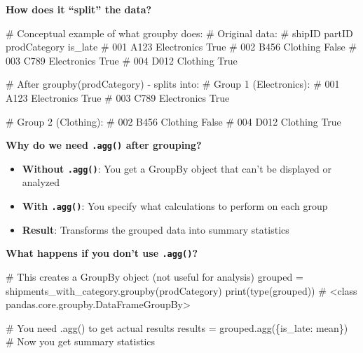 \documentclass[
  letterpaper,
  DIV=11,
  numbers=noendperiod]{scrartcl}
\newenvironment{Shaded}{\begin{snugshade}}{\end{snugshade}}
\newcommand{\BuiltInTok}[1]{\textcolor[rgb]{0.00,0.23,0.31}{#1}}
\newcommand{\CommentTok}[1]{\textcolor[rgb]{0.37,0.37,0.37}{#1}}
\newcommand{\NormalTok}[1]{\textcolor[rgb]{0.00,0.23,0.31}{#1}}
\newcommand{\OperatorTok}[1]{\textcolor[rgb]{0.37,0.37,0.37}{#1}}
\newcommand{\StringTok}[1]{\textcolor[rgb]{0.13,0.47,0.30}{#1}}
\providecommand{\tightlist}{%
  \setlength{\itemsep}{0pt}\setlength{\parskip}{0pt}}
\begin{document}
\textbf{How does it ``split'' the data?}

\begin{Shaded}
\begin{Highlighting}[]
\CommentTok{\# Conceptual example of what groupby does:}
\CommentTok{\# Original data:}
\CommentTok{\# shipID  partID  prodCategory  is\_late}
\CommentTok{\# 001     A123    Electronics   True}
\CommentTok{\# 002     B456    Clothing      False  }
\CommentTok{\# 003     C789    Electronics   True}
\CommentTok{\# 004     D012    Clothing      True}

\CommentTok{\# After groupby(\textquotesingle{}prodCategory\textquotesingle{}) {-} splits into:}
\CommentTok{\# Group 1 (Electronics):}
\CommentTok{\# 001     A123    Electronics   True}
\CommentTok{\# 003     C789    Electronics   True}

\CommentTok{\# Group 2 (Clothing):}
\CommentTok{\# 002     B456    Clothing      False}
\CommentTok{\# 004     D012    Clothing      True}
\end{Highlighting}
\end{Shaded}

\textbf{Why do we need \texttt{.agg()} after grouping?}

\begin{itemize}
\tightlist
\item
  \textbf{Without \texttt{.agg()}}: You get a GroupBy object that can't
  be displayed or analyzed
\item
  \textbf{With \texttt{.agg()}}: You specify what calculations to
  perform on each group
\item
  \textbf{Result}: Transforms the grouped data into summary statistics
\end{itemize}

\textbf{What happens if you don't use \texttt{.agg()}?}

\begin{Shaded}
\begin{Highlighting}[]
\CommentTok{\# This creates a GroupBy object (not useful for analysis)}
\NormalTok{grouped }\OperatorTok{=}\NormalTok{ shipments\_with\_category.groupby(}\StringTok{\textquotesingle{}prodCategory\textquotesingle{}}\NormalTok{)}
\BuiltInTok{print}\NormalTok{(}\BuiltInTok{type}\NormalTok{(grouped))  }\CommentTok{\# \textless{}class \textquotesingle{}pandas.core.groupby.DataFrameGroupBy\textquotesingle{}\textgreater{}}

\CommentTok{\# You need .agg() to get actual results}
\NormalTok{results }\OperatorTok{=}\NormalTok{ grouped.agg(\{}\StringTok{\textquotesingle{}is\_late\textquotesingle{}}\NormalTok{: }\StringTok{\textquotesingle{}mean\textquotesingle{}}\NormalTok{\})  }\CommentTok{\# Now you get summary statistics}
\end{Highlighting}
\end{Shaded}
\end{document}
